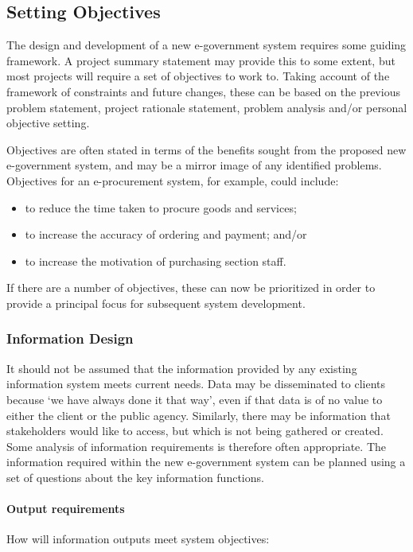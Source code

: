 \subsection{Setting Objectives}
The design and development of a new e-government system requires some guiding framework. A project summary statement may provide this to some extent, but most
projects will require a set of objectives to work to. Taking account of the framework of constraints and future changes, these can be based on the previous problem statement, project rationale statement, problem analysis and/or personal objective setting.

Objectives are often stated in terms of the benefits sought from the proposed new e-government system, and may be a mirror image of any identified problems. Objectives for an e-procurement system, for example, could include:


\begin{itemize}
\item to reduce the time taken to procure goods and services;
\item to increase the accuracy of ordering and payment; and/or
\item to increase the motivation of purchasing section staff.
\end{itemize}

If there are a number of objectives, these can now be prioritized in order to provide a principal focus for subsequent system development.


\subsubsection{Information Design}
It should not be assumed that the information provided by any existing information
system meets current needs. Data may be
disseminated to clients because ‘we have
always done it that way’, even if that data is
of no value to either the client or the public
agency. Similarly, there may be information
that stakeholders would like to access, but
which is not being gathered or created.
Some analysis of information requirements
is therefore often appropriate.
The information required within the new
e-government system can be planned using
a set of questions about the key information
functions. 


\paragraph*{Output requirements}
How will information outputs meet system
objectives:

